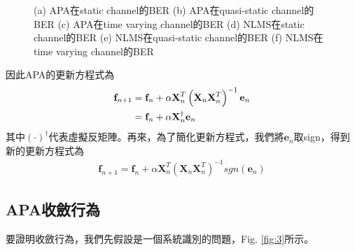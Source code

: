 \documentclass[conference]{IEEEtran}
\begin{document}
\begin{figure}[t]
{        \label{fig:4e}     
        }
        \caption{(a) APA在static channel的BER 
                 (b) APA在quasi-static channel的BER 
                 (c) APA在time varying channel的BER 
                 (d) NLMS在static channel的BER 
                 (e) NLMS在quasi-static channel的BER 
                 (f) NLMS在time varying channel的BER}
    \end{figure}
    
    因此APA的更新方程式為
    \begin{align}\label{eq:24}
        \textbf{f}_{n+1}&=\textbf{f}_n+\alpha \textbf{X}^T_n\left( \textbf{X}_n\textbf{X}^T_n \right)^{-1} \textbf{e}_n \notag \\
        &=\textbf{f}_n+\alpha \textbf{X}^{\dag}_n\textbf{e}_n
    \end{align}
    其中$\left( \cdot \right)^{\dag}$代表虛擬反矩陣。再來，為了簡化更新方程式，我們將$\textbf{e}_n$取sign，得到新的更新方程式為
    \begin{align}\label{eq:25}
         \textbf{f}_{n+1}=\textbf{f}_n+\alpha \textbf{X}^T_n\left( \textbf{X}_n\textbf{X}^T_n \right)^{-1} sgn \left( \textbf{e}_n \right)
    \end{align}
    \subsection{APA收斂行為}
    要證明收斂行為，我們先假設是一個系統識別的問題，Fig. \ref{fig:3}所示。
    
\end{document}
